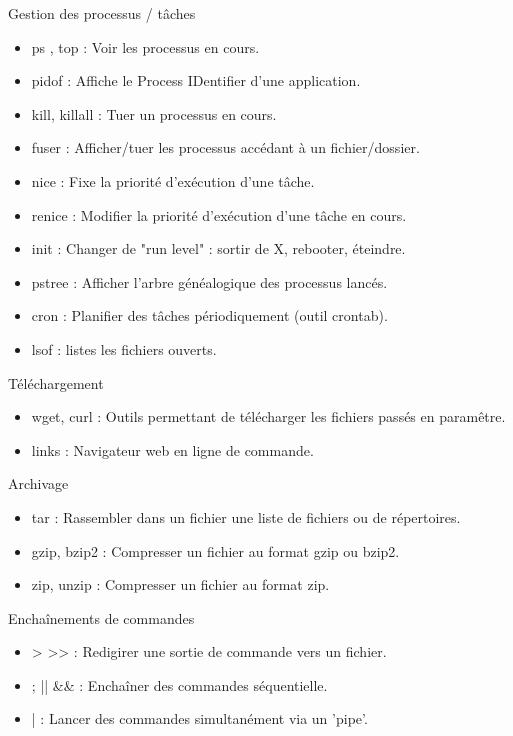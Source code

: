 \documentclass[10pt]{beamer}
\begin{document}
\begin{frame}{Gestion des processus / tâches}
\begin{itemize}
\item \alert{ps} , \alert{top} : Voir les processus en cours.
\item \alert{pidof} : Affiche le Process IDentifier d'une application.
\item \alert{kill}, \alert{killall} : Tuer un processus en cours.
\item \alert{fuser} : Afficher/tuer les processus accédant à un fichier/dossier.
\item \alert{nice} : Fixe la priorité d'exécution d'une tâche.
\item \alert{renice} : Modifier la priorité d'exécution d'une tâche en cours.
\item \alert{init} : Changer de "run level" : sortir de X, rebooter, éteindre.
\item \alert{pstree} : Afficher l'arbre généalogique des processus lancés.
\item \alert{cron} : Planifier des tâches périodiquement (outil crontab).
\item \alert{lsof} : listes les fichiers ouverts.
\end{itemize}
\end{frame}

\begin{frame}{Téléchargement}
\begin{itemize}
\item \alert{wget}, \alert{curl} : Outils permettant de télécharger les fichiers passés en paramêtre.
\item \alert{links} :\alert{ Navigateur} web en ligne de commande.
\end{itemize}
\end{frame}

\begin{frame}{Archivage}
\begin{itemize}
\item \alert{tar} : Rassembler dans un fichier une liste de fichiers ou de répertoires.
\item \alert{gzip}, \alert{bzip2} : Compresser un fichier au format gzip ou bzip2.
\item \alert{zip}, \alert{unzip} : Compresser un fichier au format zip.
\end{itemize}
\end{frame}
\begin{frame}{Enchaînements de commandes}
\begin{itemize}
\item \alert{>} \alert{>>} : Redigirer une sortie de commande vers un fichier.
\item \alert{;} \alert{||} \alert{\&\&} : Enchaîner des commandes séquentielle.
\item \alert{|} : Lancer des commandes simultanément via un 'pipe'.
\end{itemize}
\end{frame}
\end{document}
